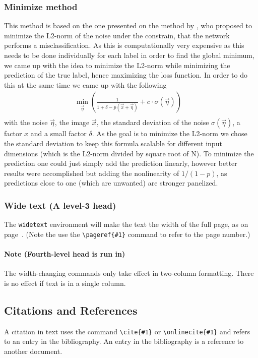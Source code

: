 \documentclass[%
 reprint,
 amsmath,amssymb,
 aps,
]{revtex4-1}
\begin{document}
\subsubsection*{Minimize method}
This method is based on the one presented on the method by \citeauthor{paperMinimize}, who proposed to minimize the L2-norm of the noise under the constrain, that the network performs a misclassification. As this is computationally very expensive as this needs to be done individually for each label in order to find the global minimum, we came up with the idea to minimize the L2-norm while minimizing the prediction of the true label, hence maximizing the loss function. In order to do this at the same time we came up with the following
\begin{align*}
\min_{\vec{\eta}} \left(\frac{1}{1 + \delta - p(\vec{x}+\vec{\eta})} + c \cdot \sigma(\vec{\eta}) \right) & \\
\end{align*}
with the noise $\vec{\eta}$, the image $\vec{x}$, the standard deviation of the noise $\sigma (\vec{\eta})$, a factor $x$ and a small factor $\delta$. As the goal is to minimize the L2-norm we chose the standard deviation to keep this formula scalable for different input dimensions (which is the L2-norm divided by square root of N). To minimize the prediction one could just simply add the prediction linearly, however better results were accomplished but adding the nonlinearity of $1/(1-p)$, as predictions close to one (which are unwanted) are stronger panelized.


\subsubsection{Wide text (A level-3 head)}
The \texttt{widetext} environment will make the text the width of the
full page, as on page~\pageref{eq:wideeq}. (Note the use the
\verb+\pageref{#1}+ command to refer to the page number.) 
\paragraph{Note (Fourth-level head is run in)}
The width-changing commands only take effect in two-column formatting. 
There is no effect if text is in a single column.

\subsection{\label{sec:citeref}Citations and References}
A citation in text uses the command \verb+\cite{#1}+ or
\verb+\onlinecite{#1}+ and refers to an entry in the bibliography. 
An entry in the bibliography is a reference to another document.
\end{document}
